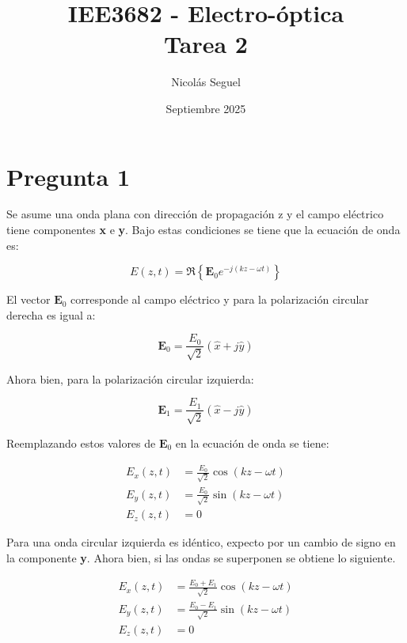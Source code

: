 \documentclass[11pt]{article}
\title{IEE3682 - Electro-óptica \\
Tarea 2}
\author{Nicolás Seguel}
\date{Septiembre 2025}
\begin{document}
\maketitle

\section*{Pregunta 1}

Se asume una onda plana con dirección de propagación z y el campo eléctrico tiene componentes \textbf{x} e \textbf{y}. Bajo estas condiciones se tiene que la ecuación de onda es:

\begin{equation*}
    E(z, t) = \Re \left\{\textbf{E}_0 e^{-j(k z - \omega t)}\right\}
\end{equation*}

El vector $\textbf{E}_0$ corresponde al campo eléctrico y para la polarización circular derecha es igual a:

\begin{equation*}
    \textbf{E}_0 = \frac{E_0}{\sqrt{2}} (\hat{x} + j \hat{y})
\end{equation*}

Ahora bien, para la polarización circular izquierda:

\begin{equation*}
    \textbf{E}_1 = \frac{E_1}{\sqrt{2}} (\hat{x} - j \hat{y})
\end{equation*}

Reemplazando estos valores de $\textbf{E}_0$ en la ecuación de onda se tiene:

\begin{align*}
    E_x(z, t) &= \frac{E_0}{\sqrt{2}} \cos(k z-\omega t) \\
    E_y(z, t) &= \frac{E_0}{\sqrt{2}} \sin(k z-\omega t) \\
    E_z(z, t) &= 0
\end{align*}

Para una onda circular izquierda es idéntico, expecto por un cambio de signo en la componente \textbf{y}. Ahora bien, si las ondas se superponen se obtiene lo siguiente.

\begin{align*}
    E_x(z, t) &= \frac{E_0 + E_1}{\sqrt{2}} \cos(k z-\omega t) \\
    E_y(z, t) &= \frac{E_0 - E_1}{\sqrt{2}} \sin(k z-\omega t) \\
    E_z(z, t) &= 0
\end{align*}
\end{document}
